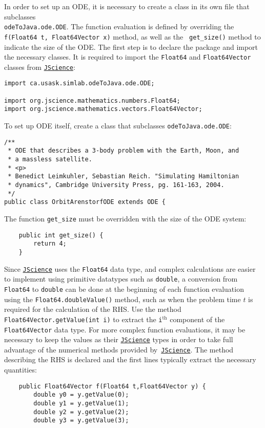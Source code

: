 \documentclass[10pt,letterpaper]{article}
\newcommand\Floatsf{{\tt Float64}}
\newcommand\Floatsfv{{\tt Float64Vector}}
\newcommand\JScience{\href{http://jscience.org/}{\tt JScience}}
\begin{document}
In order to set up an ODE, it is necessary to create a class in its own file
that subclasses\\ {\tt odeToJava.ode.ODE}. The function evaluation is defined by
overriding the {\tt f(Float64 t, Float64Vector x)} method, as well as the {\tt
get\_size()} method to indicate the size of the ODE. The first step is to
declare the package and import the necessary classes. It is required to import
the \Floatsf{} and \Floatsfv{} classes from \JScience{}:

\begin{lstlisting}
import ca.usask.simlab.odeToJava.ode.ODE;

import org.jscience.mathematics.numbers.Float64;
import org.jscience.mathematics.vectors.Float64Vector;
\end{lstlisting}

To set up ODE itself, create a class that subclasses {\tt odeToJava.ode.ODE}:

\begin{lstlisting}
/**
 * ODE that describes a 3-body problem with the Earth, Moon, and
 * a massless satellite.
 * <p>
 * Benedict Leimkuhler, Sebastian Reich. "Simulating Hamiltonian
 * dynamics", Cambridge University Press, pg. 161-163, 2004.
 */
public class OrbitArenstorfODE extends ODE {
\end{lstlisting}

The function {\tt get\_size} must be overridden with the size of the ODE system:

\begin{lstlisting}
    public int get_size() {
        return 4;
    }
\end{lstlisting}

Since \JScience{} uses the \Floatsf{} data type, and complex calculations are
easier to implement using primitive datatypes such as {\tt double}, a conversion
from \Floatsf{} to {\tt double} can be done at the beginning of each function
evaluation using the {\tt Float64.doubleValue()} method, such as when the
problem time $t$ is required for the calculation of the RHS. Use the method {\tt
Float64Vector.getValue(int i)} to extract the {\tt i}${}^{\mathrm{th}}$
component of the \Floatsfv{} data type. For more complex function evaluations,
it may be necessary to keep the values as their \JScience{} types in order to
take full advantage of the numerical methods provided by~\JScience. The method
describing the RHS is declared and the first lines typically extract the
necessary quantities:

\begin{lstlisting}
    public Float64Vector f(Float64 t,Float64Vector y) {
        double y0 = y.getValue(0);
        double y1 = y.getValue(1);
        double y2 = y.getValue(2);
        double y3 = y.getValue(3);
\end{lstlisting}
\end{document}

